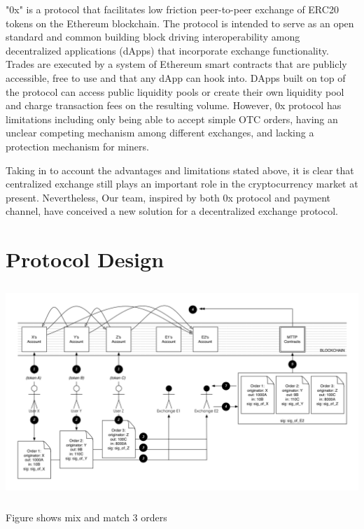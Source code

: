 \documentclass[UTF8,nofonts]{article}
\makeatletter
\newenvironment{figurehere}
 {\def\@captype{figure}}
 {}
\makeatother
\begin{document}
"0x"\cite{warren20170x} is a protocol that facilitates low friction peer-to-peer exchange of ERC20\cite{ERC20} tokens on the Ethereum blockchain. The protocol is intended to serve as an open standard and common building block driving interoperability among decentralized applications (dApps) that incorporate exchange functionality. Trades are executed by a system of Ethereum smart contracts that are publicly accessible, free to use and that any dApp can hook into. DApps built on top of the protocol can access public liquidity pools or create their own liquidity pool and charge transaction fees on the resulting volume. However, 0x protocol has limitations including  only being able to accept simple OTC orders, having an unclear competing mechanism among different exchanges, and lacking a protection mechanism for miners.

Taking in to account the advantages and limitations stated above, it is clear that centralized exchange still plays an important role in the cryptocurrency market at present. Nevertheless, Our team, inspired by both 0x protocol and payment channel, have conceived a new solution for a decentralized exchange protocol.


\section{Protocol Design\label{sec: protocol}}

\begin{center}
\begin{figurehere}
\includegraphics[height=8cm]{images/en_protocol.png}
\caption{Figure shows mix and match 3 orders}
\label{fig: Loopringrotocol}
\end{figurehere}
\end{center}
\end{document}
